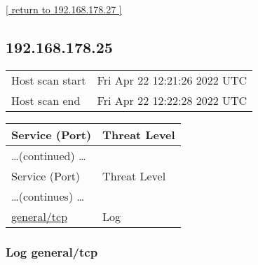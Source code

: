 \documentclass{article}
\begin{document}
\begin{footnotesize}\hyperref[host:192.168.178.27]{[ return to 192.168.178.27 ]}\end{footnotesize}
\subsection{192.168.178.25}
\label{host:192.168.178.25}

\begin{tabular}{ll}
Host scan start&Fri Apr 22 12:21:26 2022 UTC\\
Host scan end&Fri Apr 22 12:22:28 2022 UTC\\
\end{tabular}

\begin{longtable}{|l|l|}
\hline
\rowcolor{gvm_report}Service (Port)&Threat Level\\
\hline
\endfirsthead
\multicolumn{2}{l}{\hfill\ldots (continued) \ldots}\\
\hline
\rowcolor{gvm_report}Service (Port)&Threat Level\\
\hline
\endhead
\hline
\multicolumn{2}{l}{\ldots (continues) \ldots}\\
\endfoot
\hline
\endlastfoot
\hline
\hyperref[port:192.168.178.25 general/tcp Log]{general/tcp}&Log\\
\hline
\end{longtable}



\subsubsection{Log general/tcp}
\label{port:192.168.178.25 general/tcp Log}
\end{document}
